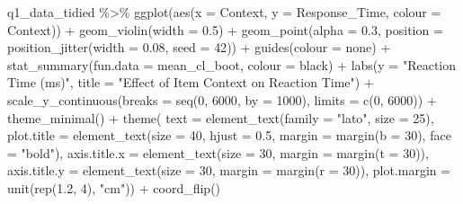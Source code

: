 \documentclass[
]{article}
\newenvironment{Shaded}{\begin{snugshade}}{\end{snugshade}}
\newcommand{\AttributeTok}[1]{\textcolor[rgb]{0.77,0.63,0.00}{#1}}
\newcommand{\DecValTok}[1]{\textcolor[rgb]{0.00,0.00,0.81}{#1}}
\newcommand{\FloatTok}[1]{\textcolor[rgb]{0.00,0.00,0.81}{#1}}
\newcommand{\FunctionTok}[1]{\textcolor[rgb]{0.00,0.00,0.00}{#1}}
\newcommand{\NormalTok}[1]{#1}
\newcommand{\SpecialCharTok}[1]{\textcolor[rgb]{0.00,0.00,0.00}{#1}}
\newcommand{\StringTok}[1]{\textcolor[rgb]{0.31,0.60,0.02}{#1}}
\begin{document}
\begin{Shaded}
\begin{Highlighting}[]
\NormalTok{q1\_data\_tidied }\SpecialCharTok{\%\textgreater{}\%} 
    \FunctionTok{ggplot}\NormalTok{(}\FunctionTok{aes}\NormalTok{(}\AttributeTok{x =}\NormalTok{ Context, }\AttributeTok{y =}\NormalTok{ Response\_Time, }\AttributeTok{colour =}\NormalTok{ Context)) }\SpecialCharTok{+}
    \FunctionTok{geom\_violin}\NormalTok{(}\AttributeTok{width =} \FloatTok{0.5}\NormalTok{) }\SpecialCharTok{+}
    \FunctionTok{geom\_point}\NormalTok{(}\AttributeTok{alpha =} \FloatTok{0.3}\NormalTok{, }\AttributeTok{position =} \FunctionTok{position\_jitter}\NormalTok{(}\AttributeTok{width =} \FloatTok{0.08}\NormalTok{, }\AttributeTok{seed =} \DecValTok{42}\NormalTok{)) }\SpecialCharTok{+}
    \FunctionTok{guides}\NormalTok{(}\AttributeTok{colour =} \StringTok{\textquotesingle{}none\textquotesingle{}}\NormalTok{) }\SpecialCharTok{+}
    \FunctionTok{stat\_summary}\NormalTok{(}\AttributeTok{fun.data =} \StringTok{\textquotesingle{}mean\_cl\_boot\textquotesingle{}}\NormalTok{, }\AttributeTok{colour =} \StringTok{\textquotesingle{}black\textquotesingle{}}\NormalTok{) }\SpecialCharTok{+}
    \FunctionTok{labs}\NormalTok{(}\AttributeTok{y =} \StringTok{"Reaction Time (ms)"}\NormalTok{,}
         \AttributeTok{title =} \StringTok{"Effect of Item Context on Reaction Time"}\NormalTok{) }\SpecialCharTok{+}
    \FunctionTok{scale\_y\_continuous}\NormalTok{(}\AttributeTok{breaks =} \FunctionTok{seq}\NormalTok{(}\DecValTok{0}\NormalTok{, }\DecValTok{6000}\NormalTok{, }\AttributeTok{by =} \DecValTok{1000}\NormalTok{),}
                       \AttributeTok{limits =} \FunctionTok{c}\NormalTok{(}\DecValTok{0}\NormalTok{, }\DecValTok{6000}\NormalTok{)) }\SpecialCharTok{+}
    \FunctionTok{theme\_minimal}\NormalTok{() }\SpecialCharTok{+}
    \FunctionTok{theme}\NormalTok{(}
      \AttributeTok{text =} \FunctionTok{element\_text}\NormalTok{(}\AttributeTok{family =} \StringTok{"lato"}\NormalTok{, }\AttributeTok{size =} \DecValTok{25}\NormalTok{),}
      \AttributeTok{plot.title =} \FunctionTok{element\_text}\NormalTok{(}\AttributeTok{size =} \DecValTok{40}\NormalTok{, }\AttributeTok{hjust =} \FloatTok{0.5}\NormalTok{, }\AttributeTok{margin =} \FunctionTok{margin}\NormalTok{(}\AttributeTok{b =} \DecValTok{30}\NormalTok{), }\AttributeTok{face =} \StringTok{"bold"}\NormalTok{),}
      \AttributeTok{axis.title.x =} \FunctionTok{element\_text}\NormalTok{(}\AttributeTok{size =} \DecValTok{30}\NormalTok{, }\AttributeTok{margin =} \FunctionTok{margin}\NormalTok{(}\AttributeTok{t =} \DecValTok{30}\NormalTok{)),}
      \AttributeTok{axis.title.y =} \FunctionTok{element\_text}\NormalTok{(}\AttributeTok{size =} \DecValTok{30}\NormalTok{, }\AttributeTok{margin =} \FunctionTok{margin}\NormalTok{(}\AttributeTok{r =} \DecValTok{30}\NormalTok{)),}
      \AttributeTok{plot.margin =} \FunctionTok{unit}\NormalTok{(}\FunctionTok{rep}\NormalTok{(}\FloatTok{1.2}\NormalTok{, }\DecValTok{4}\NormalTok{), }\StringTok{"cm"}\NormalTok{)) }\SpecialCharTok{+}
    \FunctionTok{coord\_flip}\NormalTok{()}
\end{Highlighting}
\end{Shaded}
\end{document}
